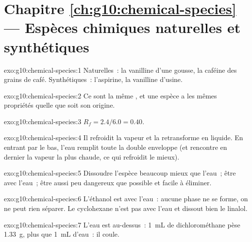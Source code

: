 \section*{Chapitre \ref{ch:g10:chemical-species} --- Espèces chimiques naturelles et synthétiques}

\begin{solution}{exo:g10:chemical-species:1}
Naturelles~: la vanilline d'une gousse, la caféine des grains de café.
Synthétiques~: l'aspirine, la vanilline d'usine.
\end{solution}

\begin{solution}{exo:g10:chemical-species:2}
Ce sont la même , et une espèce a les mêmes propriétés
quelle que soit son origine.
\end{solution}

\begin{solution}{exo:g10:chemical-species:3}
$R_f = 2.4/6.0 = 0.40$.
\end{solution}

\begin{solution}{exo:g10:chemical-species:4}
Il refroidit la vapeur et la retransforme en liquide. En entrant par le
bas, l'eau remplit toute la double enveloppe (et rencontre en dernier la
vapeur la plus chaude, ce qui refroidit le mieux).
\end{solution}

\begin{solution}{exo:g10:chemical-species:5}
Dissoudre l'espèce beaucoup mieux que l'eau~; être  avec
l'eau~; être aussi peu dangereux que possible et facile à éliminer.
\end{solution}

\begin{solution}{exo:g10:chemical-species:6}
L'éthanol est  avec l'eau~: aucune phase ne se forme, on ne peut
rien séparer. Le cyclohexane n'est pas  avec l'eau et dissout
bien le linalol.
\end{solution}

\begin{solution}{exo:g10:chemical-species:7}
L'eau est au-dessus~: \qty{1}{mL} de dichlorométhane pèse \qty{1.33}{g},
plus que \qty{1}{mL} d'eau~: il coule.
\end{solution}

